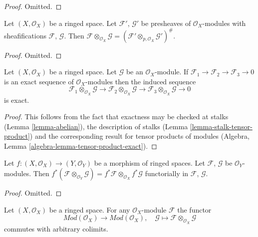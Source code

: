 \begin{proof}
Omitted.
\end{proof}

\begin{lemma}
\label{lemma-tensor-product-sheafification}
Let $(X, \mathcal{O}_X)$ be a ringed space.
Let $\mathcal{F}'$, $\mathcal{G}'$ be presheaves of $\mathcal{O}_X$-modules
with sheafifications $\mathcal{F}$, $\mathcal{G}$. Then
$\mathcal{F} \otimes_{\mathcal{O}_X} \mathcal{G} =
(\mathcal{F}' \otimes_{p, \mathcal{O}_X} \mathcal{G}')^\#$.
\end{lemma}

\begin{proof}
Omitted.
\end{proof}


\begin{lemma}
\label{lemma-tensor-product-exact}
Let $(X, \mathcal{O}_X)$ be a ringed space.
Let $\mathcal{G}$ be an $\mathcal{O}_X$-module.
If
$\mathcal{F}_1
\to \mathcal{F}_2
\to \mathcal{F}_3
\to 0$
is an exact sequence of $\mathcal{O}_X$-modules then
the induced sequence
$$
\mathcal{F}_1 \otimes_{\mathcal{O}_X} \mathcal{G} \to
\mathcal{F}_2 \otimes_{\mathcal{O}_X} \mathcal{G} \to
\mathcal{F}_3 \otimes_{\mathcal{O}_X} \mathcal{G} \to
0
$$
is exact.
\end{lemma}

\begin{proof}
This follows from the fact that exactness may be checked at stalks
(Lemma \ref{lemma-abelian}), the description of stalks
(Lemma \ref{lemma-stalk-tensor-product}) and the corresponding
result for tensor products of modules
(Algebra, Lemma \ref{algebra-lemma-tensor-product-exact}).
\end{proof}

\begin{lemma}
\label{lemma-tensor-product-pullback}
Let $f : (X, \mathcal{O}_X) \to (Y, \mathcal{O}_Y)$ be
a morphism of ringed spaces. Let $\mathcal{F}$, $\mathcal{G}$
be $\mathcal{O}_Y$-modules. Then
$f^*(\mathcal{F} \otimes_{\mathcal{O}_Y} \mathcal{G})
= f^*\mathcal{F} \otimes_{\mathcal{O}_X} f^*\mathcal{G}$
functorially in $\mathcal{F}$, $\mathcal{G}$.
\end{lemma}

\begin{proof}
Omitted.
\end{proof}

\begin{lemma}
\label{lemma-tensor-commute-colimits}
Let $(X, \mathcal{O}_X)$ be a ringed space.
For any $\mathcal{O}_X$-module $\mathcal{F}$ the functor
$$
\textit{Mod}(\mathcal{O}_X) \longrightarrow \textit{Mod}(\mathcal{O}_X)
, \quad
\mathcal{G} \longmapsto \mathcal{F} \otimes_{\mathcal{O}_X} \mathcal{G}
$$
commutes with arbitrary colimits.
\end{lemma}


